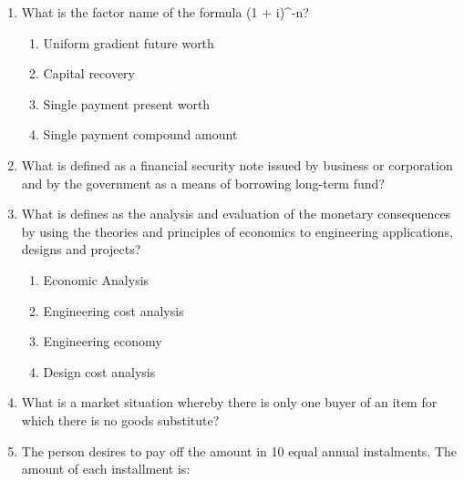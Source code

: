 \documentclass[11pt,a4paper]{article}
\begin{document}
\begin{enumerate}
\item{What is the factor name of the formula (1 + i)\^{}-n?}
\begin{enumerate}[label=\Alph*.]
\item{Uniform gradient future worth}
\item{Capital recovery}
\item{Single payment present worth}
\item{Single payment compound amount}
\end{enumerate}
\item{What is defined as a financial security note issued by business or corporation and by the government as a means of borrowing long-term fund?}
\\
\item{What is defines as the analysis and evaluation of the monetary consequences by using the theories and principles of economics to engineering applications, designs and projects?}
\begin{enumerate}[label=\Alph*.]
\item{Economic Analysis}
\item{Engineering cost analysis}
\item{Engineering economy}
\item{Design cost analysis}
\end{enumerate}
\item{What is a market situation whereby there is only one buyer of an item for which there is no goods substitute?}
\\
\item{The person desires to pay off the amount in 10 equal annual instalments. The amount of each installment is:}
\\\begin{enumerate*}[itemjoin=\qquad, label=\Alph*.]

\end{enumerate*}
\end{enumerate}
\end{document}

